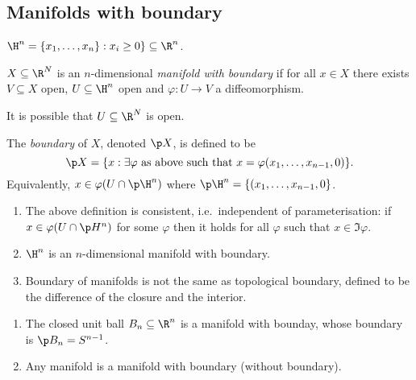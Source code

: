 \documentclass[a4paper]{article}
\begin{document}
\subsection{Manifolds with boundary}

\begin{notation}
  \(\H^n = \{x_1, \dots, x_n\}: x_i \geq 0\} \subseteq \R^n\).
\end{notation}

\begin{definition}
  \(X \subseteq \R^N\) is an \(n\)-dimensional \emph{manifold with boundary} if for all \(x \in X\) there exists \(V \subseteq X\) open, \(U \subseteq \H^n\) open and \(\varphi: U \to V\) a diffeomorphism.
\end{definition}

It is possible that \(U \subseteq \R^N\) is open.

\begin{definition}[Boundary]
  The \emph{boundary} of \(X\), denoted \(\p X\), is defined to be
  \[
    \p X = \{x: \exists \varphi \text{ as above such that } x = \varphi(x_1, \dots, x_{n - 1}, 0)\}.
  \]
  Equivalently, \(x \in \varphi(U \cap \p \H^n)\) where \(\p \H^n = \{(x_1, \dots, x_{n - 1}, 0\}\).
\end{definition}

\begin{remark}\leavevmode
  \begin{enumerate}
  \item The above definition is consistent, i.e.\ independent of parameterisation: if \(x \in \varphi(U \cap \p H^n)\) for some \(\varphi\) then it holds for all \(\varphi\) such that \(x \in \Im \varphi\).
  \item \(\H^n\) is an \(n\)-dimensional manifold with boundary.
  \item Boundary of manifolds is not the same as topological boundary, defined to be the difference of the closure and the interior.
  \end{enumerate}
\end{remark}

\begin{eg}\leavevmode
  \begin{enumerate}
  \item The closed unit ball \(B_n \subseteq \R^n\) is a manifold with bounday, whose boundary is \(\p B_n = S^{n - 1}\).
  \item Any manifold is a manifold with boundary (without boundary).
  \end{enumerate}
\end{eg}

\printindex

\iffalse
Classical differential geometry concerning geometries of curves and surfaces, from a modern point of view

Contents:
I: notions of smmoth \(k\)-dim manifolds. We study differntial topology.

Geometry is concerned with the study of rigid motions

invariants of curves: \(k\) curvature, \(\tau\) torsion
invariant of surfaces: \(K\) mean curvature, \(K\) Gaussian curvature
\fi
\end{document}
